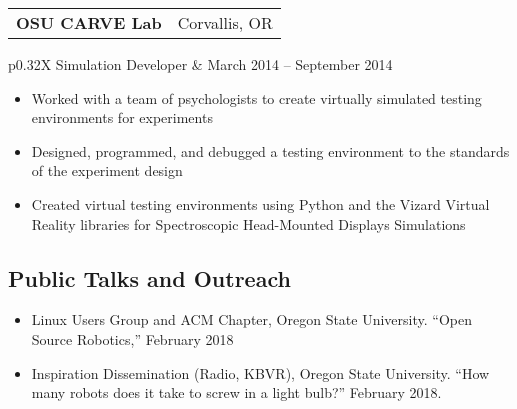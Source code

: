 \documentclass[letterpaper,10pt,titlepage]{article}
\newcommand{\leftW}{0.32\textwidth}
\begin{document}
\begin{tabularx}{\linewidth}{Xr}
	\textbf{OSU CARVE Lab} & Corvallis, OR\\
\end{tabularx}
\begin{tabularx}{\linewidth}{p{\leftW}X}
	Simulation Developer   & March 2014 -- September 2014\\
\end{tabularx}
\begin{itemize} \itemsep1pt \parskip0pt 
\item Worked with a team of psychologists to create virtually simulated testing environments for experiments
\item Designed, programmed, and debugged a testing environment to the standards of the experiment design
\item Created virtual testing environments using Python and the Vizard Virtual Reality libraries for Spectroscopic Head-Mounted Displays Simulations
\end{itemize}

\begin{comment} %
\begin{tabularx}{\linewidth}{Xr}
\textbf{\textit{Crossroads Carnegie Art Center}} & \textbf{Volunteer}\\
\textbf{Technical Support, Web Master}           & June 2013 -- August 2013\\
Baker City, Oregon & \\
\end{tabularx}

\begin{itemize} \itemsep1pt \parskip0pt \parsep0pt
\item Created digital backups of previous years tax information
\item Transferred customer data to a new cloud database for the Center
\item Maintained custom PHP/XHTML website to specifications
\item Provided consultation on creation of requirements for a new website
\end{itemize}
\end{comment}
\subsection*{Public Talks and Outreach}
\begin{itemize}
	\item Linux Users Group and ACM Chapter, Oregon State University. ``Open Source Robotics,'' February 2018
	\item Inspiration Dissemination (Radio, KBVR), Oregon State University. ``How many robots does it take to screw in a light bulb?'' February 2018. 
\end{itemize}
\end{document}
